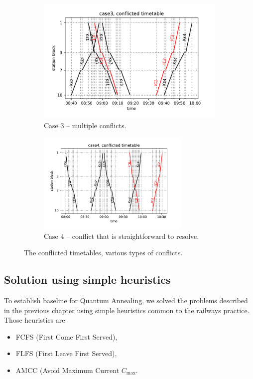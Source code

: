 \begin{figure}
  \begin{subfigure}[b]{0.4\columnwidth}
    \includegraphics[width=0.8\linewidth]{figures/case3_conflict}
    \caption{Case $3$ -- multiple conflicts.} \label{fig::c3_conflict}
  \end{subfigure}
  \begin{subfigure}[b]{0.4\columnwidth}
    \includegraphics[width=0.8\textwidth]{figures/case4_conflict}
    \caption{Case $4$ -- conflict that is straightforward to resolve.}
    \label{fig::c4_conflict}
  \end{subfigure}
  \caption{The conflicted timetables, various types of conflicts.}
  \label{fig:conflictlarge}
\end{figure}

\subsection{Solution using simple heuristics}
To establish baseline for Quantum Annealing, we solved the problems described
in the previous chapter using simple heuristics common to the railways
practice. Those heuristics are:

\begin{itemize}
  \item FCFS (First Come First Served),
  \item FLFS (First Leave First Served),
  \item AMCC (Avoid Maximum Current $C_{\max}$.
\end{itemize}


